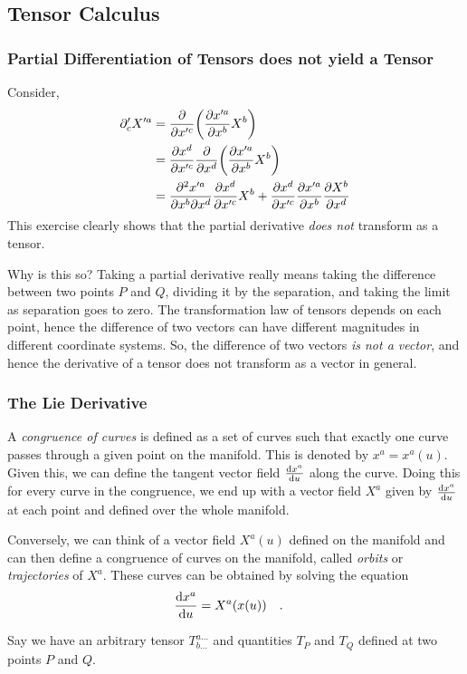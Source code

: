 \documentclass[a4paper,11pt]{article}
\begin{document}
\subsection{Tensor Calculus}
\subsubsection{Partial Differentiation of Tensors does not yield a Tensor}

Consider,
\begin{align}
\partial'_c X'^a &= \pdv{x'^c} \qty(\pdv{x'^a}{x^b} X^b) \\
&= \pdv{x^d}{x'^c} \pdv{x^d} \qty(\pdv{x'^a}{x^b} X^b) \\
&= \pdv[2]{x'^a}{x^b}{ x^d} \pdv{x^d}{x'^c} X^b + \pdv{x^d}{x'^c} \pdv{x'^a}{x^b} \pdv{X^b}{x^d} 
\end{align}
This exercise clearly shows that the partial derivative \textit{does not} transform as a tensor.

Why is this so? Taking a partial derivative really means taking the difference between two points $ P $ and $ Q $, dividing it by the separation, and taking the limit as separation goes to zero. The transformation law of tensors depends on each point, hence the difference of two vectors can have different magnitudes in different coordinate systems. So, the difference of two vectors \textit{is not a vector}, and hence the derivative of a tensor does not transform as a vector in general.

\subsubsection{The Lie Derivative}
A \textit{congruence of curves} is defined as a set of curves such that exactly one curve passes through a given point on the manifold. This is denoted by $ x^a = x^a(u) $. Given this, we can define the tangent vector field $ \dv{x^a}{u} $ along the curve. Doing this for every curve in the congruence, we end up with a vector field $ X^a $ given by $ \dv{x^a}{u} $ at each point and defined over the whole manifold.

Conversely, we can think of a vector field $ X^a(u) $ defined on the manifold and can then define a congruence of curves on the manifold, called \textit{orbits} or \textit{trajectories} of $ X^a $. These curves can be obtained by solving the equation
\begin{equation}\label{key}
\dv{x^a}{u} = X^a(x(u)) \qq{.}
\end{equation}

Say we have an arbitrary tensor $ T^{a \ldots}_{b \ldots} $ and quantities $ T_P $ and $ T_Q $ defined at two points $ P $ and $ Q $.
\end{document}

